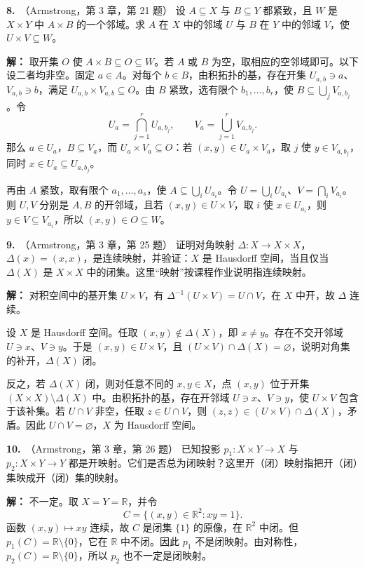 \documentclass{article}
\newcommand{\R}{\mathbb R}
\newcommand{\problem}[2]{\par\medskip\noindent\textbf{#1.}\ （#2）\quad}
\begin{document}
\problem{8}{Armstrong，第 3 章，第 21 题}
设 $A\subseteq X$ 与 $B\subseteq Y$ 都紧致，且 $W$ 是 $X\times Y$ 中 $A\times B$ 的一个邻域。求 $A$ 在 $X$ 中的邻域 $U$ 与 $B$ 在 $Y$ 中的邻域 $V$，使 $U\times V\subseteq W$。
\par\noindent\textbf{解：}
取开集 $O$ 使 $A\times B\subseteq O\subseteq W$。若 $A$ 或 $B$ 为空，取相应的空邻域即可。以下设二者均非空。固定 $a\in A$。对每个 $b\in B$，由积拓扑的基，存在开集 $U_{a,b}\ni a$、$V_{a,b}\ni b$，满足 $U_{a,b}\times V_{a,b}\subseteq O$。由 $B$ 紧致，选有限个 $b_1,\ldots,b_r$，使 $B\subseteq\bigcup_jV_{a,b_j}$。令
\[
U_a=\bigcap_{j=1}^rU_{a,b_j},\qquad V_a=\bigcup_{j=1}^rV_{a,b_j}.
\]
那么 $a\in U_a$，$B\subseteq V_a$，而 $U_a\times V_a\subseteq O$：若 $(x,y)\in U_a\times V_a$，取 $j$ 使 $y\in V_{a,b_j}$，同时 $x\in U_a\subseteq U_{a,b_j}$。

再由 $A$ 紧致，取有限个 $a_1,\ldots,a_s$，使 $A\subseteq\bigcup_iU_{a_i}$。令 $U=\bigcup_iU_{a_i}$、$V=\bigcap_iV_{a_i}$。则 $U,V$ 分别是 $A,B$ 的开邻域，且若 $(x,y)\in U\times V$，取 $i$ 使 $x\in U_{a_i}$，则 $y\in V\subseteq V_{a_i}$，所以 $(x,y)\in O\subseteq W$。

\problem{9}{Armstrong，第 3 章，第 25 题}
证明对角映射 $\Delta:X\to X\times X$，$\Delta(x)=(x,x)$，是连续映射，并验证：$X$ 是 Hausdorff 空间，当且仅当 $\Delta(X)$ 是 $X\times X$ 中的闭集。这里“映射”按课程作业说明指连续映射。
\par\noindent\textbf{解：}
对积空间中的基开集 $U\times V$，有 $\Delta^{-1}(U\times V)=U\cap V$，在 $X$ 中开，故 $\Delta$ 连续。

设 $X$ 是 Hausdorff 空间。任取 $(x,y)\notin\Delta(X)$，即 $x\ne y$。存在不交开邻域 $U\ni x$、$V\ni y$。于是 $(x,y)\in U\times V$，且 $(U\times V)\cap\Delta(X)=\varnothing$，说明对角集的补开，$\Delta(X)$ 闭。

反之，若 $\Delta(X)$ 闭，则对任意不同的 $x,y\in X$，点 $(x,y)$ 位于开集 $(X\times X)\setminus\Delta(X)$ 中。由积拓扑的基，存在开邻域 $U\ni x$、$V\ni y$，使 $U\times V$ 包含于该补集。若 $U\cap V$ 非空，任取 $z\in U\cap V$，则 $(z,z)\in(U\times V)\cap\Delta(X)$，矛盾。因此 $U\cap V=\varnothing$，$X$ 为 Hausdorff 空间。

\problem{10}{Armstrong，第 3 章，第 26 题}
已知投影 $p_1:X\times Y\to X$ 与 $p_2:X\times Y\to Y$ 都是开映射。它们是否总为闭映射？这里开（闭）映射指把开（闭）集映成开（闭）集的映射。
\par\noindent\textbf{解：}
不一定。取 $X=Y=\R$，并令
\[
C=\{(x,y)\in\R^2:xy=1\}.
\]
函数 $(x,y)\mapsto xy$ 连续，故 $C$ 是闭集 $\{1\}$ 的原像，在 $\R^2$ 中闭。但 $p_1(C)=\R\setminus\{0\}$，它在 $\R$ 中不闭。因此 $p_1$ 不是闭映射。由对称性，$p_2(C)=\R\setminus\{0\}$，所以 $p_2$ 也不一定是闭映射。
\end{document}
